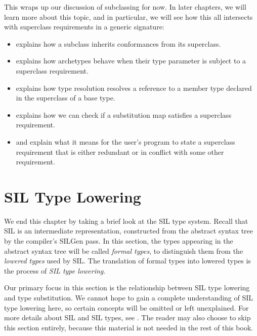 \documentclass[../generics]{subfiles}
\begin{document}
This wraps up our discussion of subclassing for now. In later chapters, we will learn more about this topic, and in particular, we will see how this all intersects with superclass requirements in a generic signature:
\begin{itemize}
\item {} explains how a subclass inherits conformances from its superclass.
\item {} explains how archetypes behave when their type parameter is subject to a superclass requirement.
\item {} explains how type resolution resolves a reference to a member type declared in the superclass of a base type.
\item {} explains how we can check if a substitution map satisfies a superclass requirement.
\item {} and  explain what it means for the user's program to state a superclass requirement that is either redundant or in conflict with some other requirement.
\end{itemize}

\section{SIL Type Lowering}\label{sec:type lowering}

We end this chapter by taking a brief look at the SIL type system. Recall that SIL is an intermediate representation, constructed from the abstract syntax tree by the compiler's SILGen pass. In this section, the types appearing in the abstract syntax tree will be called \emph{formal types}, to distinguish them from the \emph{lowered types} used by SIL. The translation of formal types into lowered types is the process of \emph{SIL type lowering}.

Our primary focus in this section is the relationship between SIL type lowering and type substitution. We cannot hope to gain a complete understanding of SIL type lowering here, so certain concepts will be omitted or left unexplained. For more details about SIL and SIL types, see \cite{sil,siltypes}. The reader may also choose to skip this section entirely, because this material is not needed in the rest of this book.
\end{document}
